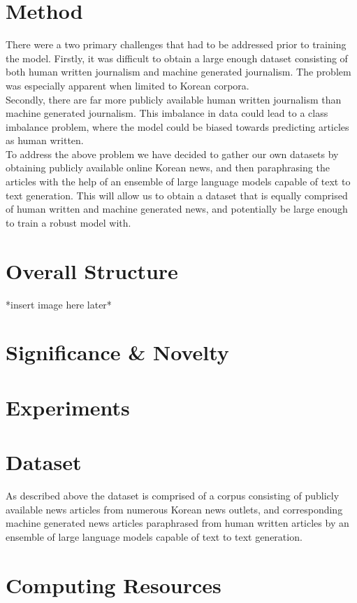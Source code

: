\documentclass{article}
\begin{document}
\section{Method}
\null\quad There were a two primary challenges that had to be addressed prior to training the model.
Firstly, it was difficult to obtain a large enough dataset consisting of both human written journalism and machine generated journalism.
The problem was especially apparent when limited to Korean corpora. \\
\null\quad Secondly, there are far more publicly available human written journalism than machine generated journalism.
This imbalance in data could lead to a class imbalance problem, where the model could be biased towards predicting articles as human written. \\
\null\quad To address the above problem we have decided to gather our own datasets by obtaining publicly available online Korean news, and then paraphrasing the articles with the help of an ensemble of large language models capable of text to text generation.
This will allow us to obtain a dataset that is equally comprised of human written and machine generated news, and potentially be large enough to train a robust model with.

\section{Overall Structure}
*insert image here later*


\section{Significance \& Novelty}


\section{Experiments}

\section{Dataset}
As described above the dataset is comprised of a corpus consisting of publicly available news articles from numerous Korean news outlets,
and corresponding machine generated news articles paraphrased from human written articles by an ensemble of large language models capable of text to text generation.

\section{Computing Resources}
\end{document}
